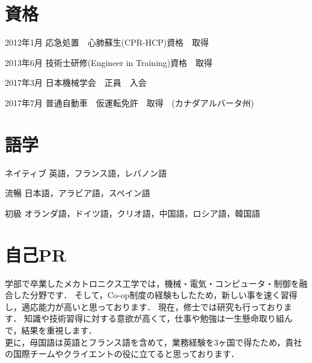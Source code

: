 \documentclass[10pt, a4paper]{article}
\begin{document}
\section{資格}
\begin{lonelist}
\item[2012年1月] 応急処置　心肺蘇生(CPR-HCP)資格　取得
\item[2013年6月] 技術士研修(Engineer in Training)資格　取得
\item[2017年3月] 日本機械学会　正員　入会
\item[2017年7月] 普通自動車　仮運転免許　取得　(カナダアルバータ州)
\end{lonelist}

\section{語学}
\begin{lonelist}
\item[ネイティブ] 英語，フランス語，レバノン語
\item[流暢] 日本語，アラビア語，スペイン語
\item[初級] オランダ語，ドイツ語，クリオ語，中国語，ロシア語，韓国語
\end{lonelist}

\section{自己PR}
学部で卒業したメカトロニクス工学では，機械・電気・コンピュータ・制御を融合した分野です．
そして，Co-op制度の経験もしたため，新しい事を速く習得し，適応能力が高いと思っております．
現在，修士では研究も行っております．
知識や技術習得に対する意欲が高くて，仕事や勉強は一生懸命取り組んで，結果を重視します． 
\\

更に，母国語は英語とフランス語を含めて，業務経験を3ヶ国で得たため，貴社の国際チームやクライエントの役に立てると思っております．
\end{document}
